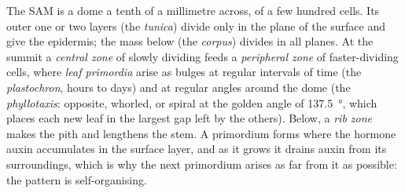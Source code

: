\begin{proposition}\label{prop:b2:plant-meristems:sam}
The SAM is a dome a tenth of a millimetre across, of a few hundred
cells. Its outer one or two layers (the \emph{tunica}) divide only
in the plane of the surface and give the epidermis; the mass below
(the \emph{corpus}) divides in all planes. At the summit a
\emph{central zone} of slowly dividing  feeds a
\emph{peripheral zone} of faster-dividing cells, where \emph{leaf
primordia} arise as bulges at regular intervals of time (the
\emph{plastochron}, hours to days) and at regular angles around the
dome (the \emph{phyllotaxis}: opposite, whorled, or spiral at the
golden angle of \qty{137.5}{\degree}, which places each new leaf in
the largest gap left by the others). Below, a \emph{rib zone} makes
the pith and lengthens the stem. A primordium forms where the
hormone auxin accumulates in the surface layer, and as it grows it
drains auxin from its surroundings, which is why the next
primordium arises as far from it as possible: the pattern is
self-organising.
\end{proposition}

